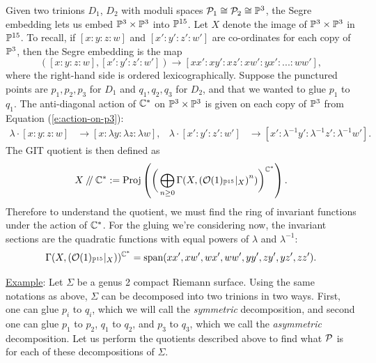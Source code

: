 	Given two trinions $D_1$, $D_2$ with moduli spaces $\mathcal{P}_1 \cong \mathcal{P}_2 \cong \mathbb{P}^3$, the Segre embedding lets us embed $\mathbb{P}^3 \times \mathbb{P}^3$ into $\mathbb{P}^{15}$. Let $X$ denote the image of $\mathbb{P}^3 \times \mathbb{P}^3$ in $\mathbb{P}^{15}$. To recall, if $[x:y:z:w]$ and $[x':y':z':w']$ are co-ordinates for each copy of $\mathbb{P}^3$, then the Segre embedding is the map
	\begin{equation}
	\label{e:segre}
	([x:y:z:w], [x':y':z':w']) \to [xx':xy':xz':xw':yx':...:ww'],
	\end{equation}
	where the right-hand side is ordered lexicographically. Suppose the punctured points are ${p_1,p_2,p_3}$ for $D_1$ and ${q_1,q_2,q_3}$ for $D_2$, and that we wanted to glue $p_1$ to $q_1$. The anti-diagonal action of $\mathbb{C}^\ast$ on $\mathbb{P}^3\times \mathbb{P}^3$ is given on each copy of $\mathbb{P}^3$ from Equation (\ref{e:action-on-p3}):
	\begin{align*}
		\lambda \cdot [x:y:z:w] &\to [x:\lambda y:\lambda z:\lambda w], & \lambda \cdot [x':y':z':w'] &\to [x':\lambda^{-1} y':\lambda^{-1} z':\lambda^{-1}w'].
	\end{align*}
	The GIT quotient is then defined as
	\begin{equation}
	X\mathbin{/\mkern-4mu/} \mathbb{C}^\ast := \text{Proj}\left(\bigg(\bigoplus_{n\geq 0} \Gamma(X, \left(\mathcal{O}(1)_{\mathbb{P}^{15}}|_X\right)^n)\bigg)^{\mathbb{C}^\ast}\right).
	\end{equation}
	Therefore to understand the quotient, we must find the ring of invariant functions under the action of $\mathbb{C}^\ast$. For the gluing we're considering now, the invariant sections are the quadratic functions with equal powers of $\lambda$ and $\lambda^{-1}$:
	\begin{equation}
		\Gamma(X, \left(\mathcal{O}(1)_{\mathbb{P}^{15}}|_X\right))^{\mathbb{C}^\ast} = \text{span}(xx',xw',wx',ww',yy',zy',yz',zz').
	\end{equation}
	
	\underline{Example}: Let $\Sigma$ be a genus 2 compact Riemann surface. Using the same notations as above, $\Sigma$ can be decomposed into two trinions in two ways. First, one can glue $p_i$ to $q_i$, which we will call the \emph{symmetric} decomposition, and second one can glue $p_1$ to $p_2$, $q_1$ to $q_2$, and $p_3$ to $q_3$, which we call the \emph{asymmetric} decomposition. Let us perform the quotients described above to find what $\mathcal{P}$ is for each of these decompositions of $\Sigma$. 
	
